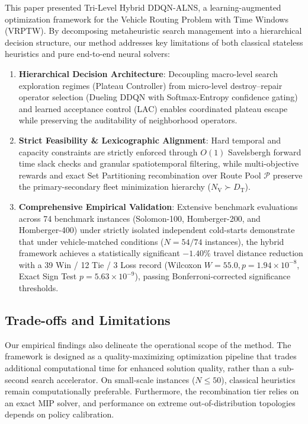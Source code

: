 \documentclass{ieeeaccess}
\newcommand{\NV}{{N_\mathrm{V}}}
\newcommand{\TD}{{D_\mathrm{T}}}
\begin{document}
This paper presented Tri-Level Hybrid DDQN-ALNS, a learning-augmented optimization framework for the Vehicle Routing Problem with Time Windows (VRPTW). By decomposing metaheuristic search management into a hierarchical decision structure, our method addresses key limitations of both classical stateless heuristics and pure end-to-end neural solvers:
\begin{enumerate}
    \item \textbf{Hierarchical Decision Architecture}: Decoupling macro-level search exploration regimes (Plateau Controller) from micro-level destroy--repair operator selection (Dueling DDQN with Softmax-Entropy confidence gating) and learned acceptance control (LAC) enables coordinated plateau escape while preserving the auditability of neighborhood operators.
    \item \textbf{Strict Feasibility \& Lexicographic Alignment}: Hard temporal and capacity constraints are strictly enforced through $O(1)$ Savelsbergh forward time slack checks and granular spatiotemporal filtering, while multi-objective rewards and exact Set Partitioning recombination over Route Pool $\mathcal{P}$ preserve the primary-secondary fleet minimization hierarchy ($\NV \succ \TD$).
    \item \textbf{Comprehensive Empirical Validation}: Extensive benchmark evaluations across 74 benchmark instances (Solomon-100, Homberger-200, and Homberger-400) under strictly isolated independent cold-starts demonstrate that under vehicle-matched conditions ($N=54/74$ instances), the hybrid framework achieves a statistically significant $-1.40\%$ travel distance reduction with a 39 Win / 12 Tie / 3 Loss record (Wilcoxon $W=55.0, p=1.94 \times 10^{-8}$, Exact Sign Test $p=5.63 \times 10^{-9}$), passing Bonferroni-corrected significance thresholds.
\end{enumerate}

\subsection{Trade-offs and Limitations}
\label{sec:concl_tradeoffs}
Our empirical findings also delineate the operational scope of the method. The framework is designed as a quality-maximizing optimization pipeline that trades additional computational time for enhanced solution quality, rather than a sub-second search accelerator. On small-scale instances ($N \le 50$), classical heuristics remain computationally preferable. Furthermore, the recombination tier relies on an exact MIP solver, and performance on extreme out-of-distribution topologies depends on policy calibration.
\end{document}

